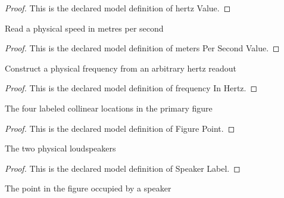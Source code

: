 \begin{proof}
  This is the declared model definition of hertz Value.
\end{proof}
\begin{definition}
  \label{def:physics:phyx-mini-0170:phyxminiproblems-problemphyxmini0170-meterspersecondvalue}
  Read a physical speed in metres per second
\end{definition}
\begin{proof}
  This is the declared model definition of meters Per Second Value.
\end{proof}
\begin{definition}
  \label{def:physics:phyx-mini-0170:phyxminiproblems-problemphyxmini0170-frequencyinhertz}
  Construct a physical frequency from an arbitrary hertz readout
\end{definition}
\begin{proof}
  This is the declared model definition of frequency In Hertz.
\end{proof}
\begin{definition}
  \label{def:physics:phyx-mini-0170:phyxminiproblems-problemphyxmini0170-figurepoint}
  The four labeled collinear locations in the primary figure
\end{definition}
\begin{proof}
  This is the declared model definition of Figure Point.
\end{proof}
\begin{definition}
  \label{def:physics:phyx-mini-0170:phyxminiproblems-problemphyxmini0170-speakerlabel}
  The two physical loudspeakers
\end{definition}
\begin{proof}
  This is the declared model definition of Speaker Label.
\end{proof}
\begin{definition}
  \label{def:physics:phyx-mini-0170:phyxminiproblems-problemphyxmini0170-speakerlabel-figurepoint}
  The point in the figure occupied by a speaker
\end{definition}
